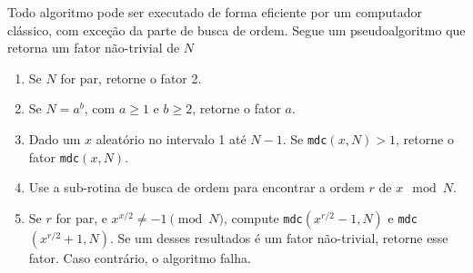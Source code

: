 Todo algoritmo pode ser executado de forma eficiente por um computador
clássico, com exceção da parte de busca de ordem.
Segue um pseudoalgoritmo que retorna um fator não-trivial de \(N\)

\begin{enumerate}
\tightlist
\item
  Se \(N\) for par, retorne o fator 2.
\item
  Se \(N = a^b\), com \(a \ge 1\) e \(b \ge 2\), retorne o fator \(a\).
\item
  Dado um \(x\) aleatório no intervalo 1 até \(N - 1\).
  Se \texttt{mdc}\((x, N) > 1\), retorne o fator \texttt{mdc}\((x, N)\).
\item
  Use a sub-rotina de busca de ordem para encontrar a ordem \(r\) de
  \(x \mod N\).
\item
  Se \(r\) for par, e \(x^{x/2} \neq -1 \pmod N\), compute
  \texttt{mdc}\((x^{r/2}-1, N)\) e \texttt{mdc}\((x^{r/2}+1, N)\).
  Se um desses resultados é um fator não-trivial, retorne esse fator.
  Caso contrário, o algoritmo falha.
\end{enumerate}
